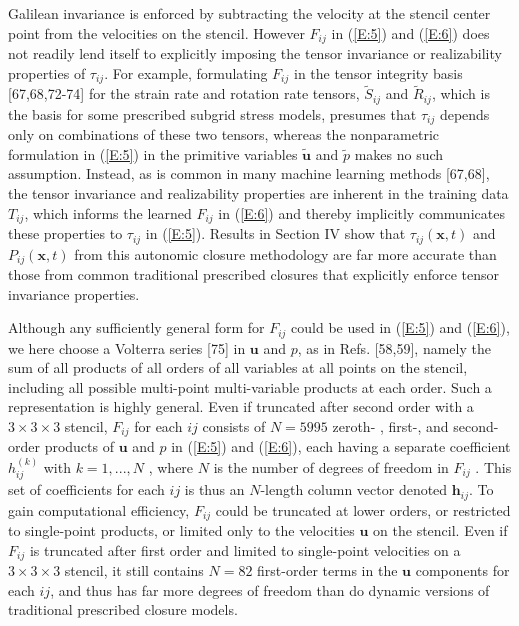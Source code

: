 Galilean invariance is enforced by subtracting the velocity at the stencil center point from the velocities on the stencil. However $F_{ij}$  in (\ref{E:5}) and (\ref{E:6}) does not readily lend itself to explicitly imposing the tensor invariance or realizability properties of  $\tau_{ij}$. For example, formulating  $F_{ij}$ in the tensor integrity basis [67,68,72-74] for the strain rate and rotation rate tensors, $\widetilde{S}_{ij}$  and $\widetilde{R}_{ij}$, which is the basis for some prescribed subgrid stress models, presumes that $\tau_{ij}$  depends only on combinations of these two tensors, whereas the nonparametric formulation in (\ref{E:5}) in the primitive variables   $\widetilde{\mathbf{u}}$  and  ${\widetilde{p}}$   makes no such assumption. Instead, as is common in many machine learning methods [67,68], the tensor invariance and realizability properties are inherent in the training data $T_{ij}$, which informs the learned $F_{ij}$  in (\ref{E:6}) and thereby implicitly communicates these properties to $\tau_{ij}$  in (\ref{E:5}). Results in Section IV show that $\tau_{ij}(\mathbf{x},t)$  and $P_{ij}(\mathbf{x},t)$   from this autonomic closure methodology are far more accurate than those from common traditional prescribed closures that explicitly enforce tensor invariance properties.

Although any sufficiently general form for  $F_{ij}$ could be used in (\ref{E:5}) and (\ref{E:6}), we here choose a Volterra series [75] in $\mathbf{u}$  and  $p$, as in Refs. [58,59], namely the sum of all products of all orders of all variables at all points on the stencil, including all possible multi-point multi-variable products at each order. Such a representation is highly general. Even if truncated after second order with a $3\times3\times3$  stencil,  $F_{ij}$ for each $ij$ consists of $N = 5995$ zeroth- , first-, and second-order products of $\mathbf{u}$  and  $p$ in (\ref{E:5}) and (\ref{E:6}), each having a separate coefficient  ${h_{ij}^{(k)}}$ with $k = {1,...,N}$  , where $N$ is the number of degrees of freedom in $F_{ij}$ . This set of coefficients for each $ij$ is thus an $N$-length column vector denoted $\mathbf{h}_{ij}$. To gain computational efficiency, $F_{ij}$  could be truncated at lower orders, or restricted to single-point products, or limited only to the velocities $\mathbf{u}$ on the stencil. Even if $F_{ij}$  is truncated after first order and limited to single-point velocities on a  $3\times3\times3$  stencil, it still contains $N=82$ first-order terms in the $\mathbf{u}$ components for each $ij$, and thus has far more degrees of freedom than do dynamic versions of traditional prescribed closure models.  

